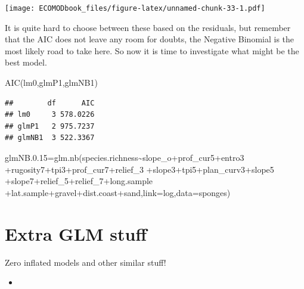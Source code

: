 \documentclass[
]{book}
\newenvironment{Shaded}{\begin{snugshade}}{\end{snugshade}}
\newcommand{\AttributeTok}[1]{\textcolor[rgb]{0.77,0.63,0.00}{#1}}
\newcommand{\FloatTok}[1]{\textcolor[rgb]{0.00,0.00,0.81}{#1}}
\newcommand{\FunctionTok}[1]{\textcolor[rgb]{0.00,0.00,0.00}{#1}}
\newcommand{\NormalTok}[1]{#1}
\newcommand{\OtherTok}[1]{\textcolor[rgb]{0.56,0.35,0.01}{#1}}
\newcommand{\SpecialCharTok}[1]{\textcolor[rgb]{0.00,0.00,0.00}{#1}}
\providecommand{\tightlist}{%
  \setlength{\itemsep}{0pt}\setlength{\parskip}{0pt}}
\begin{document}
\texttt{[image: ECOMODbook\_files/figure-latex/unnamed-chunk-33-1.pdf]}

It is quite hard to choose between these based on the residuals, but remember that the AIC does not leave any room for doubts, the Negative Binomial is the most likely road to take here. So now it is time to investigate what might be the best model.

\begin{Shaded}
\begin{Highlighting}[]
\FunctionTok{AIC}\NormalTok{(lm0,glmP1,glmNB1)}
\end{Highlighting}
\end{Shaded}

\begin{verbatim}
##        df      AIC
## lm0     3 578.0226
## glmP1   2 975.7237
## glmNB1  3 522.3367
\end{verbatim}

\begin{Shaded}
\begin{Highlighting}[]
\NormalTok{glmNB.}\FloatTok{0.15}\OtherTok{=}\FunctionTok{glm.nb}\NormalTok{(species.richness}\SpecialCharTok{\textasciitilde{}}\NormalTok{slope\_o}\SpecialCharTok{+}\NormalTok{prof\_cur5}\SpecialCharTok{+}\NormalTok{entro3 }
\SpecialCharTok{+}\NormalTok{rugosity7}\SpecialCharTok{+}\NormalTok{tpi3}\SpecialCharTok{+}\NormalTok{prof\_cur7}\SpecialCharTok{+}\NormalTok{relief\_3 }
\SpecialCharTok{+}\NormalTok{slope3}\SpecialCharTok{+}\NormalTok{tpi5}\SpecialCharTok{+}\NormalTok{plan\_curv3}\SpecialCharTok{+}\NormalTok{slope5 }
\SpecialCharTok{+}\NormalTok{slope7}\SpecialCharTok{+}\NormalTok{relief\_5}\SpecialCharTok{+}\NormalTok{relief\_7}\SpecialCharTok{+}\NormalTok{long.sample }
\SpecialCharTok{+}\NormalTok{lat.sample}\SpecialCharTok{+}\NormalTok{gravel}\SpecialCharTok{+}\NormalTok{dist.coast}\SpecialCharTok{+}\NormalTok{sand,}\AttributeTok{link=}\NormalTok{log,}\AttributeTok{data=}\NormalTok{sponges)}
\end{Highlighting}
\end{Shaded}

\hypertarget{extra-glm-stuff}{%
\section{Extra GLM stuff}\label{extra-glm-stuff}}

Zero inflated models and other similar stuff!

\begin{itemize}
\tightlist
\item
  \citet{Martin2005}
\end{itemize}
\end{document}
